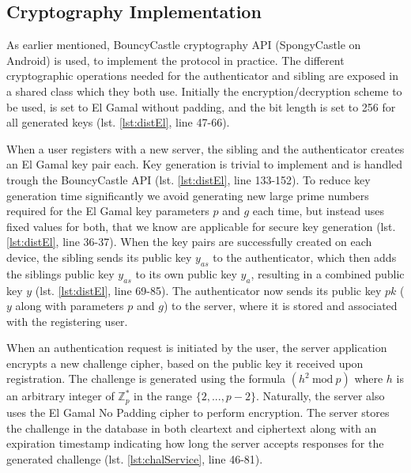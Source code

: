 \clearpage

\subsection{Cryptography Implementation} \label{crypto_impl}
As earlier mentioned, BouncyCastle cryptography API (SpongyCastle on Android) is used, to implement the protocol in practice. 
The different cryptographic operations needed for the \gls{authenticator} and \gls{sibling} are exposed in a shared class which they both use. 
Initially the encryption/decryption scheme to be used, is set to El Gamal without padding, and the bit length is set to 256 for all generated keys (lst. \ref{lst:distEl}, line 47-66). 
 
When a user registers with a new \gls{server}, the \gls{sibling} and the \gls{authenticator} creates an El Gamal key pair each. Key generation is trivial to implement and is handled trough the BouncyCastle API (lst. \ref{lst:distEl}, line 133-152).
To reduce key generation time significantly we avoid generating new large prime numbers required for the El Gamal key parameters $p$ and $g$ each time, but instead uses fixed values for both, that we know are applicable for secure key generation (lst. \ref{lst:distEl}, line 36-37).
When the key pairs are successfully created on each device, the \gls{sibling} sends its public key $y_{as}$ to the \gls{authenticator}, which then adds the \gls{sibling}s public key $y_{as}$ to its own public key $y_a$, resulting in a combined public key $y$ (lst. \ref{lst:distEl}, line 69-85). The \gls{authenticator} now sends its public key $pk$ ($y$ along with parameters $p$ and $g$) to the \gls{server}, where it is stored and associated with the registering user. 

When an authentication request is initiated by the user, the server application encrypts a new challenge cipher, based on the public key it received upon registration. 
The challenge is generated using the formula $(h^2 ~\mathrm{mod}~p)$ where $h$ is an arbitrary integer of $\mathbb{Z}^*_p$ in the range $\big\{ 2, ..., p-2 \big\}$. Naturally, the server also uses the El Gamal No Padding cipher to perform encryption. The server stores the challenge in the database in both cleartext and ciphertext along with an expiration timestamp indicating how long the \gls{server} accepts responses for the generated challenge (lst. \ref{lst:chalService}, line 46-81). 

